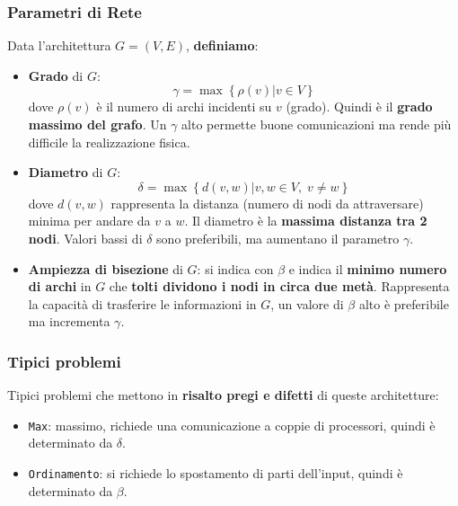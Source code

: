 	\newpage
	
	\subsubsection{Parametri di Rete}
	
	Data l'architettura $G = (V,E)$, \textbf{definiamo}: 
	\begin{itemize}
		\item \textbf{Grado} di $G$:
		$$ \gamma = \max \left\{ \rho (v) | v \in V \right\}$$
		dove $\rho (v)$ è il numero di archi incidenti su $v$ (grado). Quindi è il \textbf{grado massimo del grafo}. Un $\gamma$ alto permette buone comunicazioni ma rende più difficile la realizzazione fisica.\\
		
		\item \textbf{Diametro} di $G$: 
		$$ \delta = \max \left\{ d(v,w) | v,w \in V, \; v \neq w \right\}$$
		dove $d(v,w)$ rappresenta la distanza (numero di nodi da attraversare) minima per andare da $v$ a $w$. Il diametro è la \textbf{massima distanza tra 2 nodi}. Valori bassi di $\delta$ sono preferibili, ma aumentano il parametro $\gamma$.\\
		
		\item \textbf{Ampiezza di bisezione} di $G$: si indica con $\beta$ e indica il \textbf{minimo numero di archi} in $G$ che \textbf{tolti dividono i nodi in circa due metà}. Rappresenta la capacità di trasferire le informazioni in $G$, un valore di $\beta$ alto è preferibile ma incrementa $\gamma$.\\
	\end{itemize}
	
	
	\newpage
	
	\subsubsection{Tipici problemi} 
	Tipici problemi che mettono in \textbf{risalto pregi e difetti} di queste architetture:
	\begin{itemize}
		\item \texttt{Max}: massimo, richiede una comunicazione a coppie di processori, quindi è determinato da $\delta$.\\
		
		\item \texttt{Ordinamento}: si richiede lo spostamento di parti dell'input, quindi è determinato da $\beta$.\\
	\end{itemize}
	
